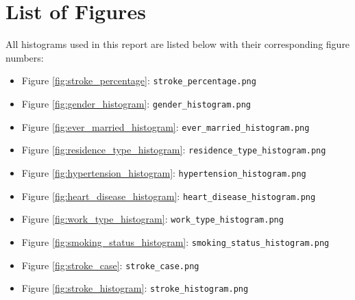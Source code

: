 \documentclass[12pt,a4paper]{article}
\begin{document}
\appendix
\section{List of Figures}
All histograms used in this report are listed below with their corresponding figure numbers:

\begin{itemize}
    \item Figure \ref{fig:stroke_percentage}: \texttt{stroke\_percentage.png}
    \item Figure \ref{fig:gender_histogram}: \texttt{gender\_histogram.png}
    \item Figure \ref{fig:ever_married_histogram}: \texttt{ever\_married\_histogram.png}
    \item Figure \ref{fig:residence_type_histogram}: \texttt{residence\_type\_histogram.png}
    \item Figure \ref{fig:hypertension_histogram}: \texttt{hypertension\_histogram.png}
    \item Figure \ref{fig:heart_disease_histogram}: \texttt{heart\_disease\_histogram.png}
    \item Figure \ref{fig:work_type_histogram}: \texttt{work\_type\_histogram.png}
    \item Figure \ref{fig:smoking_status_histogram}: \texttt{smoking\_status\_histogram.png}
    \item Figure \ref{fig:stroke_case}: \texttt{stroke\_case.png}
    \item Figure \ref{fig:stroke_histogram}: \texttt{stroke\_histogram.png}
\end{itemize}
\end{document}
